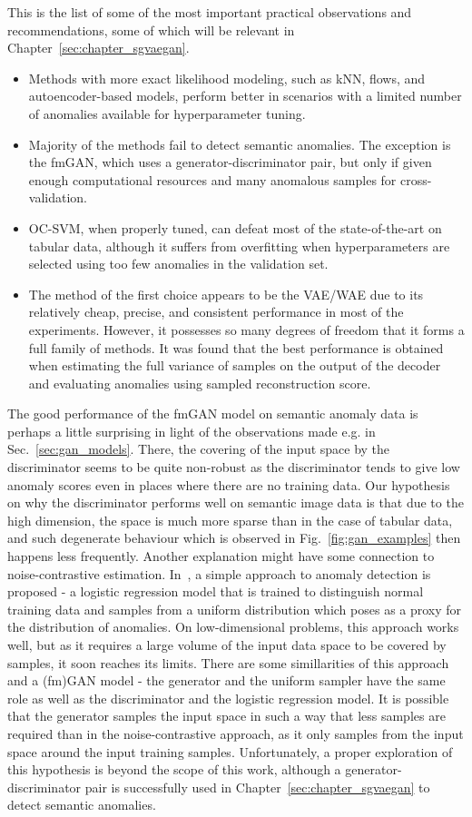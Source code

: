 This is the list of some of the most important practical observations and recommendations, some of which will be relevant in Chapter~\ref{sec:chapter_sgvaegan}.
\begin{itemize}
    \item Methods with more exact likelihood modeling, such as kNN, flows, and autoencoder-based models, perform better in scenarios with a limited number of anomalies available for hyperparameter tuning.
    \item Majority of the methods fail to detect semantic anomalies. The exception is the fmGAN, which uses a generator-discriminator pair, but only if given enough computational resources and many anomalous samples for cross-validation.
    \item OC-SVM, when properly tuned, can defeat most of the state-of-the-art on tabular data, although it suffers from overfitting when hyperparameters are selected using too few anomalies in the validation set.
    \item The method of the first choice appears to be the VAE/WAE due to its relatively cheap, precise, and consistent performance in most of the experiments. However, it possesses so many degrees of freedom that it forms a full family of methods. It was found that the best performance is obtained when estimating the full variance of samples on the output of the decoder and evaluating anomalies using sampled reconstruction score. 
\end{itemize}

The good performance of the fmGAN model on semantic anomaly data is perhaps a little surprising in light of the observations made e.g. in Sec.~\ref{sec:gan_models}. There, the covering of the input space by the discriminator seems to be quite non-robust as the discriminator tends to give low anomaly scores even in places where there are no training data. Our hypothesis on why the discriminator performs well on semantic image data is that due to the high dimension, the space is much more sparse than in the case of tabular data, and such degenerate behaviour which is observed in Fig.~\ref{fig:gan_examples} then happens less frequently. Another explanation might have some connection to noise-contrastive estimation. In~\cite{gutmann2010noise}, a simple approach to anomaly detection is proposed - a logistic regression model that is trained to distinguish normal training data and samples from a uniform distribution which poses as a proxy for the distribution of anomalies. On low-dimensional problems, this approach works well, but as it requires a large volume of the input data space to be covered by samples, it soon reaches its limits. There are some simillarities of this approach and a (fm)GAN model - the generator and the uniform sampler have the same role as well as the discriminator and the logistic regression model. It is possible that the generator samples the input space in such a way that less samples are required than in the noise-contrastive approach, as it only samples from the input space around the input training samples. Unfortunately, a proper exploration of this hypothesis is beyond the scope of this work, although a generator-discriminator pair is successfully used in Chapter~\ref{sec:chapter_sgvaegan} to detect semantic anomalies.


